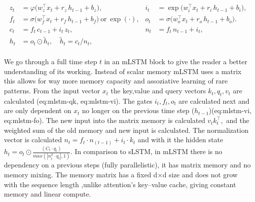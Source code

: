 \begin{align}

  z_t &= \varphi\!\big(w_z^\top x_t + r_z\,h_{t-1} + b_z\big), &

  i_t &= \exp\!\big(w_i^\top x_t + r_i\,h_{t-1} + b_i\big), \label{eq:slstm-zi}\\

  f_t &= \sigma\!\big(w_f^\top x_t + r_f\,h_{t-1} + b_f\big)\ \text{or}\ \exp(\cdot), &

  o_t &= \sigma\!\big(w_o^\top x_t + r_o\,h_{t-1} + b_o\big). \label{eq:slstm-fo}\\

  c_t &= f_t\,c_{t-1} + i_t\,z_t, &

  n_t &= f_t\,n_{t-1} + i_t, \label{eq:slstm-cn}\\

  h_t &= o_t\odot\tilde{h}_t,\quad \tilde{h}_t = c_t/n_t, &&  \label{eq:slstm-h}\\

\end{align}

We go through a full time step $t$ in an mLSTM block to give the reader a better understanding of its working. Instead of scalar memory mLSTM uses a matrix this allows for way more memory capacity and assoziative learning of rare patterns. From the input vector $x_t$ the key,value and query vectors $k_t,q_t,v_t$ are calculated (eq:mlstm-qk, eq:mlstm-vi). The gates $i_t,f_t,o_t$ are calculated next and are only dependent on $x_t$ no longer on the previous time step ($h_{t-1}$)(eq:mlstm-vi, eq:mlstm-fo). The new input into the matrix memory is  calculated $v_t k_t^\top,$ and the weighted sum of the old memory and new input is calculated. The normalization vector is calculated $ n_t = f_t·n_(t-1) + i_t·k_t $ and with it the hidden state $h_t = o_t ⊙ \frac{(C_t·q_t)}{max(|n_t^T·q_t|, 1)}$. In comparison to sLSTM, in mLSTM there is no dependency on a previous steps (fully parallelistic), it has matrix memory and no memory mixing. The memory matrix has a fixed d×d size and does not grow with the sequence length ,unlike attention's key–value cache, giving constant memory and linear compute.








